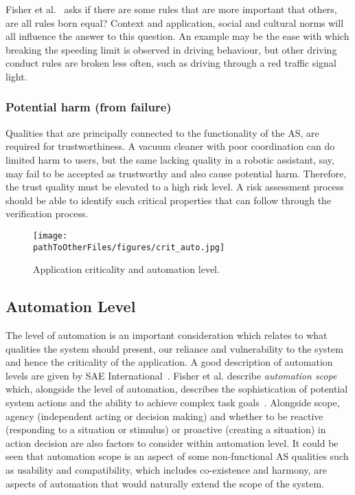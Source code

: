 Fisher et al.~\cite{Fisher2021} asks if there are some rules that are more important that others, are all rules born equal? Context and application, social and cultural norms will all influence the answer to this question. An example may be the ease with which breaking the speeding limit is observed in driving behaviour, but other driving conduct rules are broken less often, such as driving through a red traffic signal light.

\subsubsection{Potential harm (from failure)} \label{sec:app-harm}

Qualities that are principally connected to the functionality of the AS, are required for trustworthiness. A vacuum cleaner with poor coordination can do limited harm to users, but the same lacking quality in a robotic assistant, say, may fail to be accepted as trustworthy and also cause potential harm. Therefore, the trust quality must be elevated to a high risk level.
%
A risk assessment process should be able to identify such critical properties that can follow through the verification process. 

\begin{figure}[]
    \centering
    \texttt{[image: \\pathToOtherFiles/figures/crit\_auto.jpg]}
    \caption{Application criticality and automation level.}
    \label{fig:critauto}
\end{figure}


\subsection{Automation Level} \label{sec:autlev}

The level of automation is an important consideration which relates to what qualities the system should present, our reliance and vulnerability to the system and hence the criticality of the application. A good description of automation levels are given by SAE International~\cite{SAEJ3016}. 
%
Fisher et al. describe \emph{automation scope} which, alongside the level of automation, describes the sophistication of potential system actions and the ability to achieve complex task goals~\cite{Fisher2021}. 
%
Alongside scope, agency (independent acting or decision making) and whether to be reactive (responding to a situation or stimulus) or proactive (creating a situation) in action decision are also factors to consider within automation level.
%
%
%
It could be seen that automation scope is an aspect of some non-functional AS qualities such as usability and compatibility, which includes co-existence and harmony, are aspects of automation that would naturally extend the scope of the system. 


